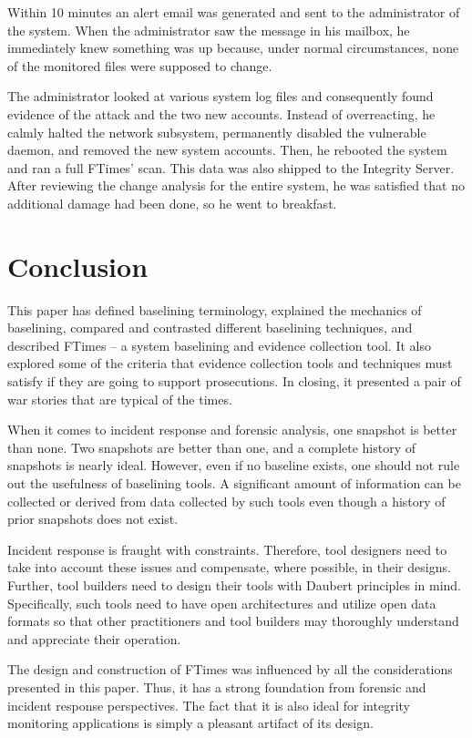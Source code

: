 \documentclass[10pt]{article}
\begin{document}
Within 10 minutes an alert email was generated and sent to the
administrator of the system.  When the administrator saw the message
in his mailbox, he immediately knew something was up because, under
normal circumstances, none of the monitored files were supposed to
change.

The administrator looked at various system log files and consequently
found evidence of the attack and the two new accounts.  Instead of
overreacting, he calmly halted the network subsystem, permanently
disabled the vulnerable daemon, and removed the new system accounts.
Then, he rebooted the system and ran a full FTimes' scan.  This
data was also shipped to the Integrity Server.  After reviewing
the change analysis for the entire system, he was satisfied that
no additional damage had been done, so he went to breakfast.

\section{Conclusion}

This paper has defined baselining terminology, explained the
mechanics of baselining, compared and contrasted different baselining
techniques, and described FTimes -- a system baselining and evidence
collection tool.  It also explored some of the criteria that evidence
collection tools and techniques must satisfy if they are going to
support prosecutions.  In closing, it presented a pair of war
stories that are typical of the times.

When it comes to incident response and forensic analysis, one
snapshot is better than none.  Two snapshots are better than one,
and a complete history of snapshots is nearly ideal.  However, even
if no baseline exists, one should not rule out the usefulness of
baselining tools.  A significant amount of information can be
collected or derived from data collected by such tools even though
a history of prior snapshots does not exist.

Incident response is fraught with constraints.  Therefore, tool
designers need to take into account these issues and compensate,
where possible, in their designs.  Further, tool builders need to
design their tools with Daubert principles in mind.  Specifically,
such tools need to have open architectures and utilize open data
formats so that other practitioners and tool builders may thoroughly
understand and appreciate their operation.

The design and construction of FTimes was influenced by all the
considerations presented in this paper.  Thus, it has a strong
foundation from forensic and incident response perspectives.  The
fact that it is also ideal for integrity monitoring applications
is simply a pleasant artifact of its design.
\end{document}
